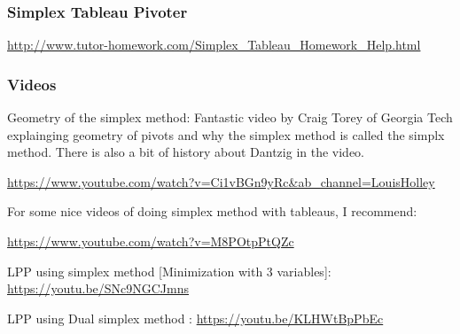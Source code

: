 %

\subsubsection{Simplex Tableau Pivoter}
\url{http://www.tutor-homework.com/Simplex_Tableau_Homework_Help.html}

\subsubsection{Videos}

Geometry of the simplex method: Fantastic video by Craig Torey of Georgia Tech explainging geometry of pivots and why the simplex method is called the simplx method.  There is also a bit of history about Dantzig in the video.

\url{https://www.youtube.com/watch?v=Ci1vBGn9yRc&ab_channel=LouisHolley}


For some nice videos of doing simplex method with tableaus, I recommend:

\url{https://www.youtube.com/watch?v=M8POtpPtQZc}

LPP using simplex method [Minimization with 3 variables]: \url{https://youtu.be/SNc9NGCJmns}

LPP using Dual simplex method : \url{https://youtu.be/KLHWtBpPbEc}

